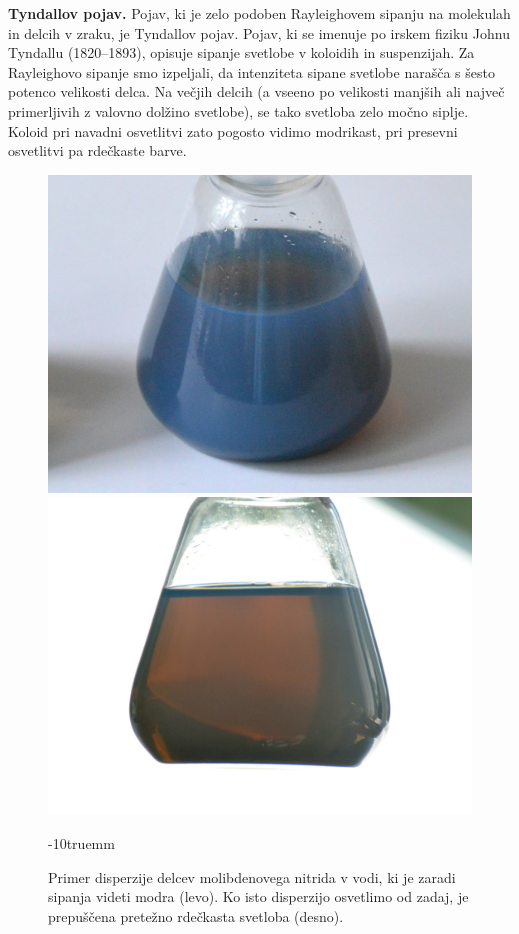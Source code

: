 \begin{example}{\bf Tyndallov pojav.} Pojav, ki je zelo podoben Rayleighovem sipanju
na molekulah in delcih v zraku, je Tyndallov pojav. Pojav, ki se imenuje po irskem fiziku
Johnu Tyndallu (1820--1893), opisuje sipanje svetlobe v koloidih in suspenzijah. Za Rayleighovo
sipanje smo izpeljali, da intenziteta sipane svetlobe narašča s šesto potenco velikosti
delca. Na večjih delcih (a vseeno po velikosti manjših ali največ primerljivih z valovno dolžino 
svetlobe), se tako svetloba zelo močno siplje. Koloid pri navadni 
osvetlitvi zato pogosto vidimo modrikast, pri presevni osvetlitvi pa rdečkaste barve.
\begin{figure}[!h]
\centering
\includegraphics[width=7truecm]{slike/07_Mo2N1.jpg}\hfill
\includegraphics[width=7truecm]{slike/07_Mo2N2.jpg}
\caption{Primer disperzije delcev molibdenovega nitrida v vodi, ki je zaradi sipanja
videti modra (levo). Ko isto disperzijo osvetlimo od zadaj, je prepuščena pretežno rdečkasta
svetloba (desno).}
\label{fig:07_NeboPol}
\vglue-10truemm
\end{figure}

\end{example}

